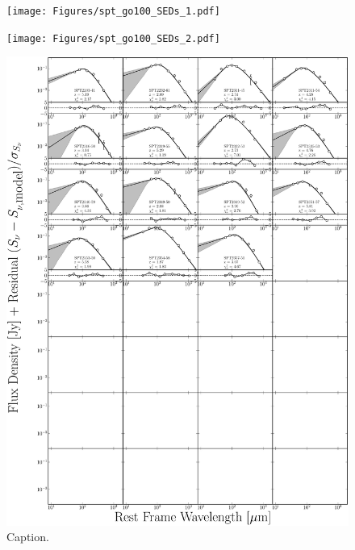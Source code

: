 \begin{figure}
	\centering
	\texttt{[image: Figures/spt\_go100\_SEDs\_1.pdf]}
\end{figure}
\begin{figure}
	\centering
	\texttt{[image: Figures/spt\_go100\_SEDs\_2.pdf]}
\end{figure}
\begin{figure}
	\centering
	\includegraphics[width=\columnwidth]{Figures/spt_go100_SEDs_3.pdf}
	\caption[Caption]{Caption.}
\end{figure}


